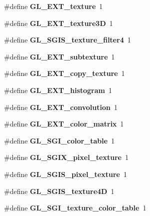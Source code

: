 \begin{DoxyCompactItemize}
\item 
\#define {\bfseries G\+L\+\_\+\+E\+X\+T\+\_\+texture}~1\label{_s_d_l__opengl_8h_a0ad74c04d9f14a6790e9546b8258c3de}

\item 
\#define {\bfseries G\+L\+\_\+\+E\+X\+T\+\_\+texture3\+D}~1\label{_s_d_l__opengl_8h_af42b23bc79791783cef8b3d961f29371}

\item 
\#define {\bfseries G\+L\+\_\+\+S\+G\+I\+S\+\_\+texture\+\_\+filter4}~1\label{_s_d_l__opengl_8h_a55c3a8c248d0202bbe8da3441032c7db}

\item 
\#define {\bfseries G\+L\+\_\+\+E\+X\+T\+\_\+subtexture}~1\label{_s_d_l__opengl_8h_a2a56b245f90ee5827c2a31ba1e6bd431}

\item 
\#define {\bfseries G\+L\+\_\+\+E\+X\+T\+\_\+copy\+\_\+texture}~1\label{_s_d_l__opengl_8h_a7f0153d0680cb8629504a7bed8bc2c02}

\item 
\#define {\bfseries G\+L\+\_\+\+E\+X\+T\+\_\+histogram}~1\label{_s_d_l__opengl_8h_a15e9c43c5e863def30c3f0b5dcdc55e5}

\item 
\#define {\bfseries G\+L\+\_\+\+E\+X\+T\+\_\+convolution}~1\label{_s_d_l__opengl_8h_a1538688be378607b694f4a1e23300a37}

\item 
\#define {\bfseries G\+L\+\_\+\+E\+X\+T\+\_\+color\+\_\+matrix}~1\label{_s_d_l__opengl_8h_a54e55b1c36d076bbf42632c357473dba}

\item 
\#define {\bfseries G\+L\+\_\+\+S\+G\+I\+\_\+color\+\_\+table}~1\label{_s_d_l__opengl_8h_a9bc55b2058a4c2e48ce5bd49e0520238}

\item 
\#define {\bfseries G\+L\+\_\+\+S\+G\+I\+X\+\_\+pixel\+\_\+texture}~1\label{_s_d_l__opengl_8h_af9c19bef0b2cdfb1c674bef3cf39736c}

\item 
\#define {\bfseries G\+L\+\_\+\+S\+G\+I\+S\+\_\+pixel\+\_\+texture}~1\label{_s_d_l__opengl_8h_a900d346da0ecda3f2a510b4f28c97f9a}

\item 
\#define {\bfseries G\+L\+\_\+\+S\+G\+I\+S\+\_\+texture4\+D}~1\label{_s_d_l__opengl_8h_af2f871866b351190e144ab3e250a3c32}

\item 
\#define {\bfseries G\+L\+\_\+\+S\+G\+I\+\_\+texture\+\_\+color\+\_\+table}~1\label{_s_d_l__opengl_8h_a7358a87d230afeb8a7417147608ae7d7}


\end{DoxyCompactItemize}
